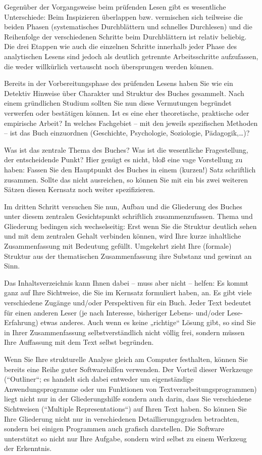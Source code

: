 \documentclass[]{book}
\theoremstyle{definition}
\theoremstyle{definition}
\theoremstyle{definition}
\theoremstyle{remark}
\begin{document}
Gegenüber der Vorgangsweise beim prüfenden Lesen gibt es wesentliche
Unterschiede: Beim Inspizieren überlappen bzw. vermischen sich teilweise
die beiden Phasen (systematisches Durchblättern und schnelles
Durchlesen) und die Reihenfolge der verschiedenen Schritte beim
Durchblättern ist relativ beliebig. Die drei Etappen wie auch die
einzelnen Schritte innerhalb jeder Phase des analytischen Lesens sind
jedoch als deutlich getrennte Arbeitsschritte aufzufassen, die weder
willkürlich vertauscht noch übersprungen werden können.

Bereits in der Vorbereitungsphase des prüfenden Lesens haben Sie wie ein
Detektiv Hinweise über Charakter und Struktur des Buches gesammelt. Nach
einem gründlichen Studium sollten Sie nun diese Vermutungen begründet
verwerfen oder bestätigen können. Ist es eine eher theoretische,
praktische oder empirische Arbeit? In welches Fachgebiet -- mit den
jeweils spezifischen Methoden -- ist das Buch einzuordnen (Geschichte,
Psychologie, Soziologie, Pädagogik,\ldots{})?

Was ist das zentrale Thema des Buches? Was ist die wesentliche
Fragestellung, der entscheidende Punkt? Hier genügt es nicht, bloß eine
vage Vorstellung zu haben: Fassen Sie den Hauptpunkt des Buches in einem
(kurzen!) Satz schriftlich zusammen. Sollte das nicht ausreichen, so
können Sie mit ein bis zwei weiteren Sätzen diesen Kernsatz noch weiter
spezifizieren.

Im dritten Schritt versuchen Sie nun, Aufbau und die Gliederung des
Buches unter diesem zentralen Gesichtspunkt schriftlich
zusammenzufassen. Thema und Gliederung bedingen sich wechselseitig: Erst
wenn Sie die Struktur deutlich sehen und mit dem zentralen Gehalt
verbinden können, wird Ihre kurze inhaltliche Zusammenfassung mit
Bedeutung gefüllt. Umgekehrt zieht Ihre (formale) Struktur aus der
thematischen Zusammenfassung ihre Substanz und gewinnt an Sinn.

Das Inhaltsverzeichnis kann Ihnen dabei -- muss aber nicht -- helfen: Es
kommt ganz auf Ihre Sichtweise, die Sie im Kernsatz formuliert haben,
an. Es gibt viele verschiedene Zugänge und/oder Perspektiven für ein
Buch. Jeder Text bedeutet für einen anderen Leser (je nach Interesse,
bisheriger Lebens- und/oder Lese-Erfahrung) etwas anderes. Auch wenn es
keine „richtige`` Lösung gibt, so sind Sie in Ihrer Zusammenfassung
selbstverständlich nicht völlig frei, sondern müssen Ihre Auffassung mit
dem Text selbst begründen.

Wenn Sie Ihre strukturelle Analyse gleich am Computer festhalten, können
Sie bereits eine Reihe guter Softwarehilfen verwenden. Der Vorteil
dieser Werkzeuge (``Outliner``; es handelt sich dabei entweder um
eigenständige Anwendungsprogramme oder um Funktionen von
Textverarbeitungsprogrammen) liegt nicht nur in der Gliederungshilfe
sondern auch darin, dass Sie verschiedene Sichtweisen (``Multiple
Representations``) auf Ihren Text haben. So können Sie Ihre Gliederung
nicht nur in verschiedenen Detaillierungsgraden betrachten, sondern bei
einigen Programmen auch grafisch darstellen. Die Software unterstützt so
nicht nur Ihre Aufgabe, sondern wird selbst zu einem Werkzeug der
Erkenntnis.
\end{document}
